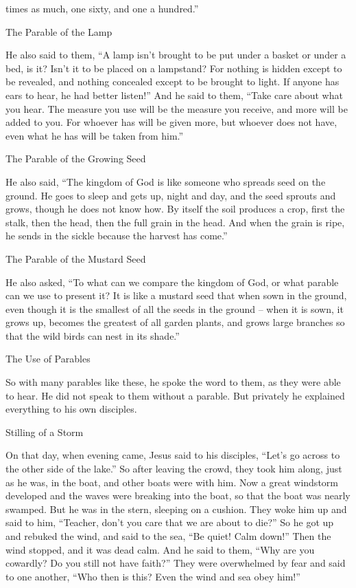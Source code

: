 {times as much, one sixty,
and
one a hundred.”
\par }{\SH The Parable of the Lamp
\par }{\PP {}He
also
said
to them,
“A lamp
isn’t
brought
to
be put
under
a basket
or
under
a bed,
is it? Isn’t
it
to
be placed
on
a lampstand?
For
nothing
is
hidden
except
to
be revealed,
and nothing
concealed
except
to
be brought
to
light.
If
anyone
has
ears
to hear,
he had better listen!”
And
he said
to them,
“Take care
about what
you hear.
The measure
you use will be
the measure
you
receive,
and
more will be added
to you.
For
whoever
has
will be given
more, but
whoever
does
not
have,
even
what
he has
will be taken
from
him.”
\par }{\SH The Parable of the Growing Seed
\par }{\PP {}He
also
said,
“The kingdom
of God
is
like
someone
who spreads
seed
on
the ground.
He goes to sleep
and
gets up,
night
and
day,
and
the seed
sprouts
and
grows,
though
he does
not
know how.
By itself
the soil
produces
a crop,
first
the stalk,
then
the head, then
the full
grain
in
the head.
And
when
the grain
is ripe,
he sends
in the sickle
because
the harvest
has come.”
\par }{\SH The Parable of the Mustard Seed
\par }{\PP {}He
also
asked,
“To what
can we compare
the kingdom
of God,
or
what
parable
can we use to present
it?
It is like
a mustard
seed
that
when
sown
in
the ground,
even though it is
the smallest
of all
the seeds
in
the ground –
when
it is sown,
it grows up,
becomes
the greatest
of all
garden plants,
and
grows
large
branches
so that
the wild birds
can
nest
in
its
shade.”
\par }{\SH The Use of Parables
\par }{\PP {}So
with many
parables
like these,
he spoke
the word
to them,
as
they were able
to hear.
He did
not
speak
to them
without
a parable.
But
privately
he explained
everything
to his own
disciples.
\par }{\SH Stilling of a Storm
\par }{\PP {}On
that
day,
when
evening
came,
Jesus said
to his disciples,
“Let’s go across
to
the other side of the lake.”
So
after leaving
the crowd,
they took
him
along,
just as
he was,
in
the boat,
and
other
boats
were
with
him.
Now a
great
windstorm
developed
and
the waves
were breaking
into
the boat,
so that
the boat
was
nearly
swamped.
But
he
was
in
the stern,
sleeping
on
a cushion.
They woke
him
up
and
said
to him,
“Teacher,
don’t
you
care
that
we are about to die?”
So
he got up
and rebuked
the wind,
and
said
to the sea, “Be quiet! Calm down!” Then
the wind
stopped,
and
it was
dead
calm.
And
he said
to them,
“Why
are you
cowardly? Do you
still not
have
faith?”
They were overwhelmed by fear
and
said
to
one another,
“Who
then
is
this? Even the wind
and
sea
obey
him!”

}
